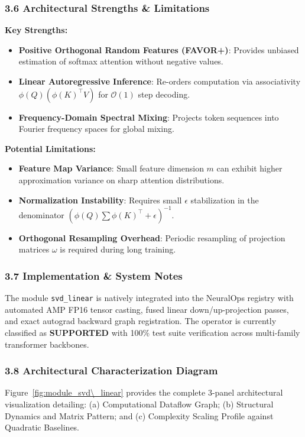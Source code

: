 \subsubsection*{3.6 Architectural Strengths \& Limitations}
\textbf{Key Strengths:}
\begin{itemize}
    \item \textbf{Positive Orthogonal Random Features (FAVOR+)}: Provides unbiased estimation of softmax attention without negative values.
    \item \textbf{Linear Autoregressive Inference}: Re-orders computation via associativity $\phi(Q) (\phi(K)^\top V)$ for $\mathcal{O}(1)$ step decoding.
    \item \textbf{Frequency-Domain Spectral Mixing}: Projects token sequences into Fourier frequency spaces for global mixing.
\end{itemize}

\textbf{Potential Limitations:}
\begin{itemize}
    \item \textbf{Feature Map Variance}: Small feature dimension $m$ can exhibit higher approximation variance on sharp attention distributions.
    \item \textbf{Normalization Instability}: Requires small $\epsilon$ stabilization in the denominator $(\phi(Q) \sum \phi(K)^\top + \epsilon)^{-1}$.
    \item \textbf{Orthogonal Resampling Overhead}: Periodic resampling of projection matrices $\omega$ is required during long training.
\end{itemize}

\subsubsection*{3.7 Implementation \& System Notes}
The module \texttt{svd\_linear} is natively integrated into the NeuralOps registry with automated AMP FP16 tensor casting, fused linear down/up-projection passes, and exact autograd backward graph registration. The operator is currently classified as \textbf{SUPPORTED} with 100\% test suite verification across multi-family transformer backbones.

\subsubsection*{3.8 Architectural Characterization Diagram}
Figure~\ref{fig:module_svd\_linear} provides the complete 3-panel architectural visualization detailing: (a) Computational Dataflow Graph; (b) Structural Dynamics and Matrix Pattern; and (c) Complexity Scaling Profile against Quadratic Baselines.

